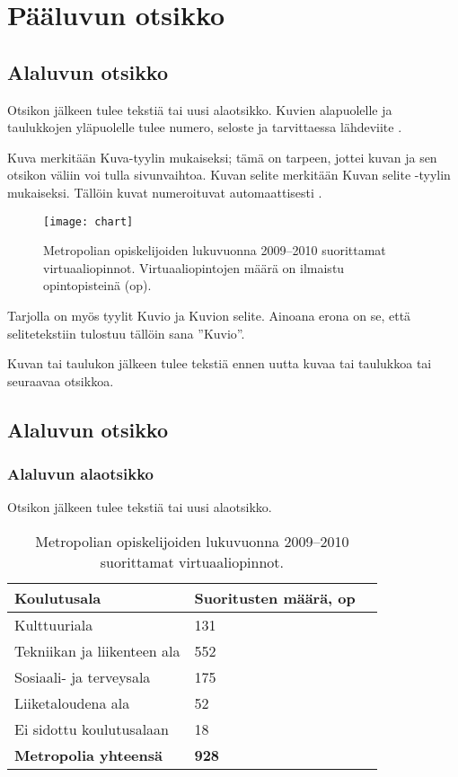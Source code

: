 \chapter{Pääluvun otsikko}

\section{Alaluvun otsikko}
Otsikon jälkeen tulee tekstiä tai uusi alaotsikko. Kuvien alapuolelle ja taulukkojen yläpuolelle tulee numero, seloste ja tarvittaessa lähdeviite \cite{examplesite2}.

Kuva merkitään Kuva-tyylin mukaiseksi; tämä on tarpeen, jottei kuvan ja sen otsikon väliin voi tulla sivunvaihtoa. Kuvan selite merkitään Kuvan selite -tyylin mukaiseksi. Tällöin kuvat numeroituvat automaattisesti \cite{examplesite}.

\begin{figure}[h]
  \texttt{[image: chart]}
  \caption{Metropolian opiskelijoiden lukuvuonna 2009–2010 suorittamat virtuaaliopinnot. Virtuaaliopintojen määrä on ilmaistu opintopisteinä (op).}
  \label{fig:chart}
\end{figure}

Tarjolla on myös tyylit Kuvio ja Kuvion selite. Ainoana erona on se, että selitetekstiin tulostuu tällöin sana ”Kuvio”.

Kuvan tai taulukon jälkeen tulee tekstiä ennen uutta kuvaa tai taulukkoa tai seuraavaa otsikkoa.

\section{Alaluvun otsikko}

\subsection{Alaluvun alaotsikko}

Otsikon jälkeen tulee tekstiä tai uusi alaotsikko.

\begin{table}[h]
  \caption{Metropolian opiskelijoiden lukuvuonna 2009–2010 suorittamat virtuaaliopinnot.}
  \begin{tabular}{| l | l | l |}
  \hline
  \bfseries Koulutusala & \bfseries Suoritusten määrä, op \\
  \hline
  Kulttuuriala & 131 \\
  \hline
  Tekniikan ja liikenteen ala & 552 \\
  \hline
  Sosiaali- ja terveysala & 175 \\
  \hline
  Liiketaloudena ala & 52 \\
  \hline
  Ei sidottu koulutusalaan & 18 \\
  \hline
  \bfseries Metropolia yhteensä & \bfseries 928 \\
  \hline
  \end{tabular}
  \label{tab:virtual studies}
\end{table}

